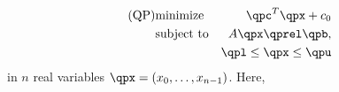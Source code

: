 \begin{eqnarray*}
\mbox{(QP)}& \mbox{minimize} 
& \qpc^{T}\qpx+c_0 \\
&\mbox{subject to}   & A\qpx\qprel \qpb, \\
&                    & \qpl \leq \qpx \leq \qpu
\end{eqnarray*}
in $n$ real variables $\qpx=(x_0,\ldots,x_{n-1})$.
Here, 
\begin{itemize}



\end{itemize}
